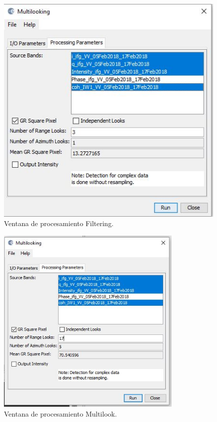 \documentclass{article}
\begin{document}
\begin{figure}[htbp]
\begin{minipage}[b]{0.5\linewidth}
\includegraphics[width=\linewidth]{Imagen/16.JPG}
\caption{Ventana de procesamiento Filtering.}
\label{fig:figura16}
\end{minipage}
\end{figure}
\begin{figure}[htbp]
    \centering
    \includegraphics[width=9cm]{Imagen/17.JPG}
    \caption{Ventana de procesamiento Multilook.}
    \label{fig:07}
    \end{figure}
\end{document}

